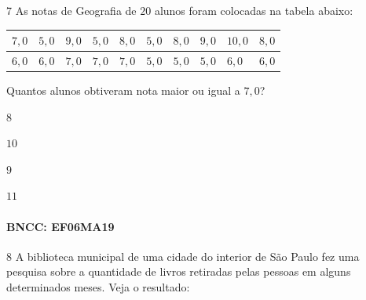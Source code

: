 
\num{7}  As notas de Geografia de $20$ alunos foram colocadas na tabela abaixo:


\begin{longtable}[]{@{}llllllllll@{}}
\toprule
$7,0$ & $5,0$ & $9,0$ & $5,0$ & $8,0$ & $5,0$ & $8,0$ & $9,0$ & $10,0$ &
$8,0$\tabularnewline
\midrule
\endhead
$6,0$ & $6,0$ & $7,0$ & $7,0$ & $7,0$ & $5,0$ & $5,0$ & $5,0$ & $6,0$ & $6,0$\tabularnewline
\bottomrule
\end{longtable}

Quantos alunos obtiveram nota maior ou igual a $7,0$?

\begin{escolha}
\item $8$
\item $10$
\item $9$
\item $11$
\end{escolha}

\paragraph{BNCC: EF06MA19}


\num{8}  A biblioteca municipal de uma cidade do interior de São Paulo fez uma
pesquisa sobre a quantidade de livros retiradas pelas pessoas em alguns
determinados meses. Veja o resultado:

